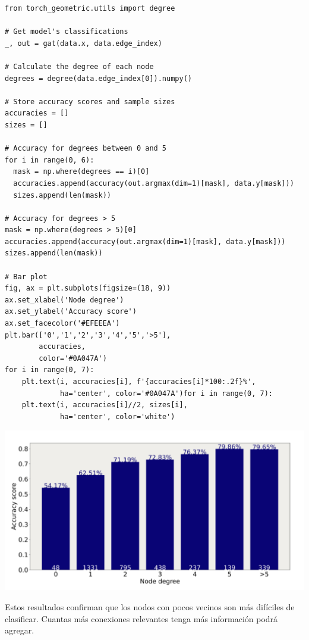 \documentclass{article}
\begin{document}
\vspace{0.5cm}

\begin{lstlisting}[style=mystyle]
from torch_geometric.utils import degree

# Get model's classifications
_, out = gat(data.x, data.edge_index)

# Calculate the degree of each node
degrees = degree(data.edge_index[0]).numpy()

# Store accuracy scores and sample sizes
accuracies = []
sizes = []

# Accuracy for degrees between 0 and 5
for i in range(0, 6):
  mask = np.where(degrees == i)[0]  
  accuracies.append(accuracy(out.argmax(dim=1)[mask], data.y[mask]))
  sizes.append(len(mask))

# Accuracy for degrees > 5
mask = np.where(degrees > 5)[0]
accuracies.append(accuracy(out.argmax(dim=1)[mask], data.y[mask]))
sizes.append(len(mask))

# Bar plot
fig, ax = plt.subplots(figsize=(18, 9))
ax.set_xlabel('Node degree')
ax.set_ylabel('Accuracy score')
ax.set_facecolor('#EFEEEA')
plt.bar(['0','1','2','3','4','5','>5'],
        accuracies,
        color='#0A047A')
for i in range(0, 7):
    plt.text(i, accuracies[i], f'{accuracies[i]*100:.2f}%',
             ha='center', color='#0A047A')for i in range(0, 7):
    plt.text(i, accuracies[i]//2, sizes[i],
             ha='center', color='white')
\end{lstlisting}

\vspace{0.5cm}

\begin{center}
    \includegraphics[width=0.75\linewidth]{img/barras.png}
\end{center}

\vspace{0.5cm}

Estos resultados confirman que los nodos con pocos vecinos son más difíciles de clasificar. Cuantas más conexiones relevantes tenga más información podrá agregar.
\end{document}
